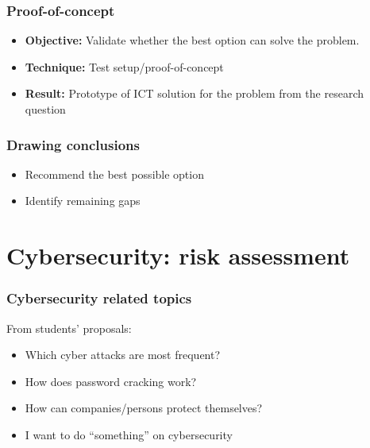\documentclass[aspectratio=169]{beamer}
\begin{document}
\begin{frame}
  \frametitle{Proof-of-concept}

  \begin{itemize}
    \item \textbf{Objective:} Validate whether the best option can solve the problem.
    \item \textbf{Technique:} Test setup/proof-of-concept
    \item \textbf{Result:} Prototype of ICT solution for the problem from the research question
  \end{itemize}

\end{frame}

\begin{frame}
  \frametitle{Drawing conclusions}

  \begin{itemize}
    \item Recommend the best possible option
    \item Identify remaining gaps
  \end{itemize}
\end{frame}

\section{Cybersecurity: risk assessment}

\begin{frame}
  \frametitle{Cybersecurity related topics}

  From students' proposals:

  \begin{itemize}
    \item Which cyber attacks are most frequent?
    \item How does password cracking work?
    \item How can companies/persons protect themselves?
    \item I want to do ``something'' on cybersecurity
  \end{itemize}

  \bigskip


\end{frame}
\end{document}
